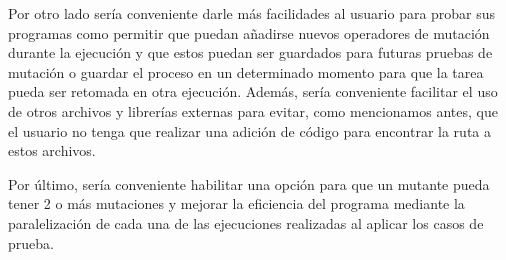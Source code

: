Por otro lado sería conveniente darle más facilidades al usuario para probar sus programas como permitir que puedan añadirse nuevos operadores de mutación durante la ejecución y que estos puedan ser guardados para futuras pruebas de mutación o guardar el proceso en un determinado momento para que la tarea pueda ser retomada en otra ejecución. Además, sería conveniente facilitar el uso de otros archivos y librerías externas para evitar, como mencionamos antes, que el usuario no tenga que realizar una adición de código para encontrar la ruta a estos archivos.

Por último, sería conveniente habilitar una opción para que un mutante pueda tener 2 o más mutaciones y mejorar la eficiencia del programa mediante la paralelización de cada una de las ejecuciones realizadas al aplicar los casos de prueba.


